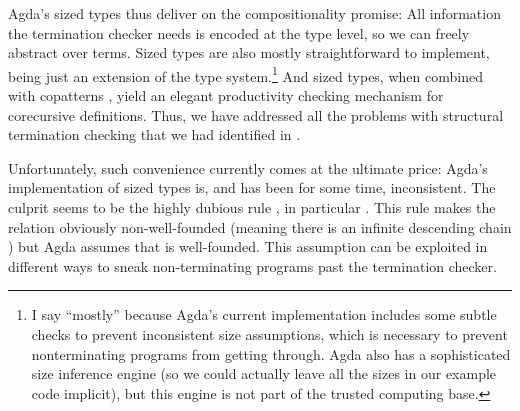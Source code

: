 Agda's sized types thus deliver on the compositionality promise: All information
the termination checker needs is encoded at the type level, so we can freely
abstract over terms. Sized types are also mostly straightforward to implement,
being just an extension of the type system.\footnote{I say \enquote{mostly}
  because Agda's current implementation includes some subtle checks to prevent
  inconsistent size assumptions, which is necessary to prevent nonterminating
  programs from getting through. Agda also has a sophisticated size inference
  engine (so we could actually leave all the sizes in our example code
  implicit), but this engine is not part of the trusted computing base.} And
sized types, when combined with copatterns \cite{abel2016}, yield an elegant
productivity checking mechanism for corecursive definitions. Thus, we have
addressed all the problems with structural termination checking that we had
identified in .

Unfortunately, such convenience currently comes at the ultimate price: Agda's
implementation of sized types is, and has been for some time, inconsistent. The
culprit seems to be the highly dubious rule , in particular
. This rule makes the \icode{<} relation obviously non-well-founded
(meaning there is an infinite descending chain ) but Agda
assumes that \icode{<} is well-founded. This assumption can be exploited in
different ways \cite{agdabug2015,agdabug2016,agdabug2017,agdabug2018} to sneak
non-terminating programs past the termination checker.
